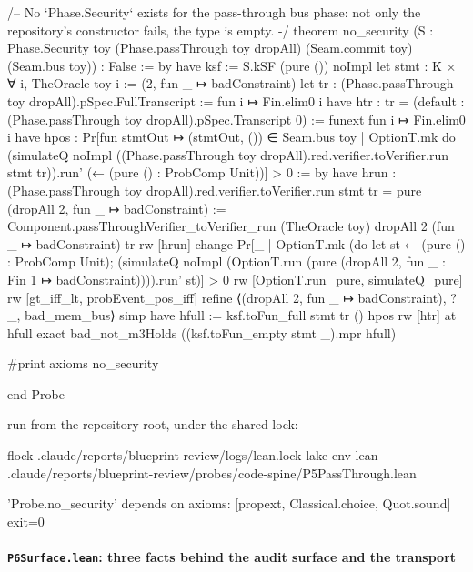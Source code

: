 \begin{leancode}
/-- No `Phase.Security` exists for the pass-through bus phase: not only the repository's
constructor fails, the type is empty. -/
theorem no_security (S : Phase.Security toy (Phase.passThrough toy dropAll) (Seam.commit toy)
    (Seam.bus toy)) : False := by
  have ksf := S.kSF (pure ()) noImpl
  let stmt : K × ∀ i, TheOracle toy i := (2, fun _ ↦ badConstraint)
  let tr : (Phase.passThrough toy dropAll).pSpec.FullTranscript := fun i ↦ Fin.elim0 i
  have htr : tr = (default : (Phase.passThrough toy dropAll).pSpec.Transcript 0) :=
    funext fun i ↦ Fin.elim0 i
  have hpos : Pr[fun stmtOut ↦ (stmtOut, ()) ∈ Seam.bus toy | OptionT.mk do
      (simulateQ noImpl ((Phase.passThrough toy dropAll).red.verifier.toVerifier.run stmt
        tr)).run' (← (pure () : ProbComp Unit))] > 0 := by
    have hrun : (Phase.passThrough toy dropAll).red.verifier.toVerifier.run stmt tr =
        pure (dropAll 2, fun _ ↦ badConstraint) :=
      Component.passThroughVerifier_toVerifier_run (TheOracle toy) dropAll 2
        (fun _ ↦ badConstraint) tr
    rw [hrun]
    change Pr[_ | OptionT.mk (do let st ← (pure () : ProbComp Unit); (simulateQ noImpl
      (OptionT.run (pure (dropAll 2, fun _ : Fin 1 ↦ badConstraint)))).run' st)] > 0
    rw [OptionT.run_pure, simulateQ_pure]
    rw [gt_iff_lt, probEvent_pos_iff]
    refine ⟨(dropAll 2, fun _ ↦ badConstraint), ?_, bad_mem_bus⟩
    simp
  have hfull := ksf.toFun_full stmt tr () hpos
  rw [htr] at hfull
  exact bad_not_m3Holds ((ksf.toFun_empty stmt _).mpr hfull)

#print axioms no_security

end Probe
\end{leancode}

run from the repository root, under the shared lock:

\begin{shellcode}
flock .claude/reports/blueprint-review/logs/lean.lock lake env lean .claude/reports/blueprint-review/probes/code-spine/P5PassThrough.lean
\end{shellcode}


\begin{srccode}
'Probe.no_security' depends on axioms: [propext, Classical.choice, Quot.sound]
exit=0
\end{srccode}

\paragraph{\texttt{P6Surface.lean}: three facts behind the audit surface and the transport}\label{sec:gen-probe-spine-P6Surface}

